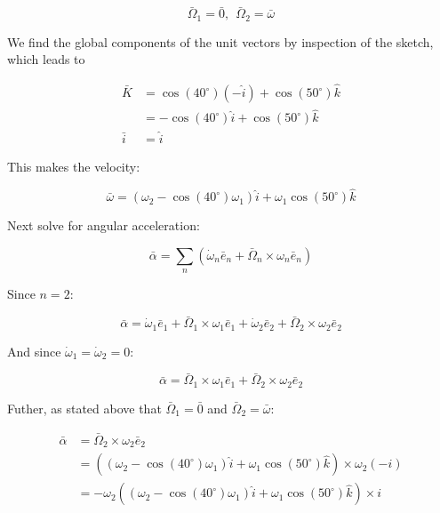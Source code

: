 \documentclass[12pt, letterpaper]{../assignment}
\begin{document}
$$ \bar{\Omega}_1 = \bar{0}, \ \ \bar{\Omega}_2 = \bar{\omega} $$

We find the global components of the unit vectors by inspection of the sketch, which leads to

\begin{equation*}
\begin{aligned}
\bar{K} &= \cos(40^\circ)(-\hat{i}) + \cos(50^\circ)\hat{k} \\
        &= -\cos(40^\circ)\hat{i} + \cos(50^\circ)\hat{k}  \\
\bar{i} &= \hat{i} 
\end{aligned}
\end{equation*}

This makes the velocity:

\begin{answer}
$$ \bar{\omega} = \left(\omega_2-\cos(40^\circ)\omega_1\right) \hat{i} + \omega_1\cos(50^\circ)\hat{k} $$
\end{answer}

Next solve for angular acceleration:

$$ \bar{\alpha} =
\sum_n \left( \dot{\omega}_n \bar{e}_n + \bar{\Omega}_n \times \omega_n \bar{e}_n \right) $$

Since $n=2$:

$$ \bar{\alpha} =
\dot{\omega}_1 \bar{e}_1 + \bar{\Omega}_1 \times \omega_1 \bar{e}_1 +
\dot{\omega}_2 \bar{e}_2 + \bar{\Omega}_2 \times \omega_2 \bar{e}_2 $$

And since $\dot{\omega}_1 = \dot{\omega}_2 = 0$:

$$ \bar{\alpha} =
\bar{\Omega}_1 \times \omega_1 \bar{e}_1 +
\bar{\Omega}_2 \times \omega_2 \bar{e}_2 $$

Futher, as stated above that $\bar{\Omega}_1 = \bar{0}$ and $\bar{\Omega}_2 = \bar{\omega}$:

\begin{equation*}
\begin{aligned}
\bar{\alpha} &= \bar{\Omega}_2 \times \omega_2 \bar{e}_2\\
             &= \left( \left(\omega_2-\cos(40^\circ)\omega_1\right) \hat{i} + \omega_1\cos(50^\circ)\hat{k} \right)
                \times \omega_2 (-i)\\
            &= -\omega_2 \left( \left(\omega_2-\cos(40^\circ)\omega_1\right) \hat{i} + \omega_1\cos(50^\circ)\hat{k} \right)
                \times i\\
\end{aligned}
\end{equation*}
\end{document}
